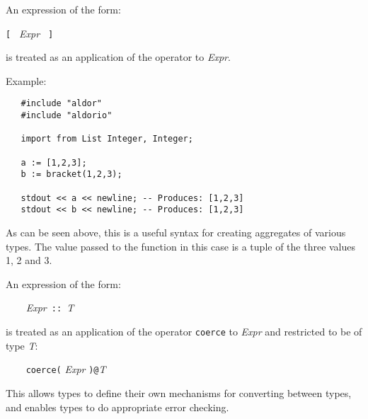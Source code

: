 
An expression of the form:

{\small \verb^[ ^ {\em Expr} \verb^ ]^}

is treated as an application of the operator  to {\em
Expr}.

Example:

\begin{small}%
\begin{verbatim}
   #include "aldor"
   #include "aldorio"

   import from List Integer, Integer;

   a := [1,2,3];
   b := bracket(1,2,3);

   stdout << a << newline; -- Produces: [1,2,3]
   stdout << b << newline; -- Produces: [1,2,3]

\end{verbatim}
\end{small}

As can be seen above, this is a useful syntax for creating aggregates
of various types. The value passed to the  function in
this case is a tuple of the three values 1, 2 and 3.


An expression of the form:

{\small \verb^    ^{\em Expr}\verb^ :: ^{\em T}}

is treated as an application of the operator \verb"coerce" to {\em
Expr} and restricted to be of type {\em T}:

{\small \verb^    coerce(^ {\em Expr} \verb^)@^{\em T}}

This allows types to define their own mechanisms for converting
between types, and enables types to do appropriate error checking.
